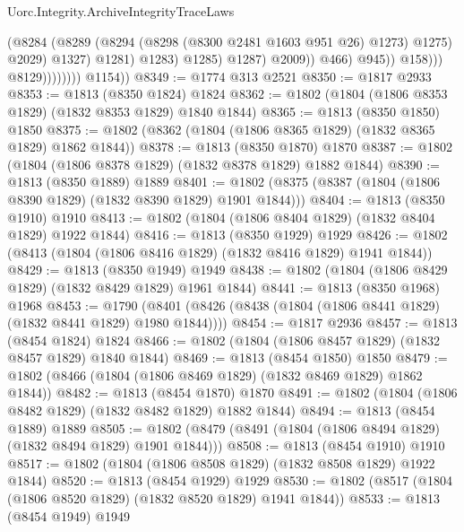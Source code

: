 \begin{lexlean}{Uorc.Integrity.ArchiveIntegrityTraceLaws}
\begin{coremodule}
                                                (@8284
                                                  (@8289
                                                    (@8294
                                                      (@8298 (@8300 @2481 @1603 @951 @26) @1273)
                                                      @1275)
                                                    @2029)
                                                  @1327)
                                                @1281)
                                              @1283)
                                            @1285)
                                          @1287)
                                        @2009))
                                    @466)
                                  @945))
                              @158)))
                        @8129))))))))
        @1154))
@8349 := @1774 @313 @2521
@8350 := @1817 @2933
@8353 := @1813 (@8350 @1824) @1824
@8362 := @1802 (@1804 (@1806 @8353 @1829) (@1832 @8353 @1829) @1840 @1844)
@8365 := @1813 (@8350 @1850) @1850
@8375 := @1802 (@8362 (@1804 (@1806 @8365 @1829) (@1832 @8365 @1829) @1862 @1844))
@8378 := @1813 (@8350 @1870) @1870
@8387 := @1802 (@1804 (@1806 @8378 @1829) (@1832 @8378 @1829) @1882 @1844)
@8390 := @1813 (@8350 @1889) @1889
@8401 := @1802 (@8375 (@8387 (@1804 (@1806 @8390 @1829) (@1832 @8390 @1829) @1901 @1844)))
@8404 := @1813 (@8350 @1910) @1910
@8413 := @1802 (@1804 (@1806 @8404 @1829) (@1832 @8404 @1829) @1922 @1844)
@8416 := @1813 (@8350 @1929) @1929
@8426 := @1802 (@8413 (@1804 (@1806 @8416 @1829) (@1832 @8416 @1829) @1941 @1844))
@8429 := @1813 (@8350 @1949) @1949
@8438 := @1802 (@1804 (@1806 @8429 @1829) (@1832 @8429 @1829) @1961 @1844)
@8441 := @1813 (@8350 @1968) @1968
@8453 := @1790 (@8401 (@8426 (@8438 (@1804 (@1806 @8441 @1829) (@1832 @8441 @1829) @1980 @1844))))
@8454 := @1817 @2936
@8457 := @1813 (@8454 @1824) @1824
@8466 := @1802 (@1804 (@1806 @8457 @1829) (@1832 @8457 @1829) @1840 @1844)
@8469 := @1813 (@8454 @1850) @1850
@8479 := @1802 (@8466 (@1804 (@1806 @8469 @1829) (@1832 @8469 @1829) @1862 @1844))
@8482 := @1813 (@8454 @1870) @1870
@8491 := @1802 (@1804 (@1806 @8482 @1829) (@1832 @8482 @1829) @1882 @1844)
@8494 := @1813 (@8454 @1889) @1889
@8505 := @1802 (@8479 (@8491 (@1804 (@1806 @8494 @1829) (@1832 @8494 @1829) @1901 @1844)))
@8508 := @1813 (@8454 @1910) @1910
@8517 := @1802 (@1804 (@1806 @8508 @1829) (@1832 @8508 @1829) @1922 @1844)
@8520 := @1813 (@8454 @1929) @1929
@8530 := @1802 (@8517 (@1804 (@1806 @8520 @1829) (@1832 @8520 @1829) @1941 @1844))
@8533 := @1813 (@8454 @1949) @1949

\end{coremodule}
\end{lexlean}
